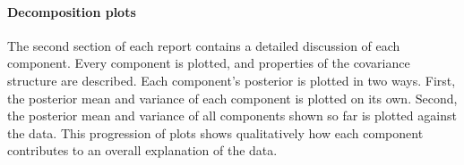 \documentclass{article}
\begin{document}
%
%
%
%



\paragraph{Decomposition plots}

The second section of each report contains a detailed discussion of each component.
Every component is plotted, and properties of the covariance structure are described.
Each component's posterior is plotted in two ways.  First, the posterior mean and variance of each component is plotted on its own.  Second, the posterior mean and variance of all components shown so far is plotted against the data.  This progression of plots 
shows qualitatively how each component contributes to an overall explanation of the data.
\end{document}
